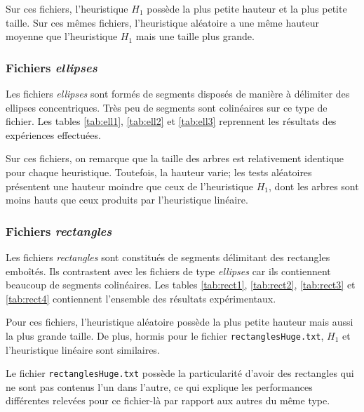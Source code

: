 Sur ces fichiers, l'heuristique $H_1$
possède la plus petite hauteur et la plus petite taille.
Sur ces mêmes fichiers, l'heuristique aléatoire a une même hauteur moyenne
que l'heuristique $H_1$ mais une taille plus grande.
\subsubsection*{Fichiers \og\emph{ellipses}\fg}
Les fichiers \og\emph{ellipses}\fg{} sont formés de segments disposés de manière
à délimiter des ellipses concentriques. Très peu de segments
sont colinéaires sur ce type de fichier.
Les tables \ref{tab:ell1}, \ref{tab:ell2} et \ref{tab:ell3} reprennent les
résultats des expériences effectuées.

Sur ces fichiers, on remarque que la taille des arbres
est relativement identique pour chaque heuristique.
Toutefois, la hauteur varie; les tests aléatoires présentent
une hauteur moindre que ceux de l'heuristique $H_1$, dont les arbres
sont moins hauts que ceux produits par l'heuristique linéaire.

\subsubsection*{Fichiers \og\emph{rectangles}\fg}
Les fichiers \og\emph{rectangles}\fg{} sont constitués de segments
délimitant des rectangles emboîtés. Ils contrastent avec les fichiers
de type \og\emph{ellipses}\fg{} car ils contiennent beaucoup de segments
colinéaires. Les tables \ref{tab:rect1}, \ref{tab:rect2}, \ref{tab:rect3}
et \ref{tab:rect4} contiennent
l'ensemble des résultats expérimentaux.

Pour ces fichiers, l'heuristique aléatoire possède
la plus petite hauteur mais aussi la plus grande taille.
De plus, hormis pour le fichier \texttt{rectanglesHuge.txt}, $H_1$
et l'heuristique linéaire sont similaires.

Le fichier \texttt{rectanglesHuge.txt} possède la particularité d'avoir des
rectangles qui ne sont pas contenus l'un dans l'autre, ce qui explique
les performances différentes relevées pour ce fichier-là par rapport aux
autres du même type.

